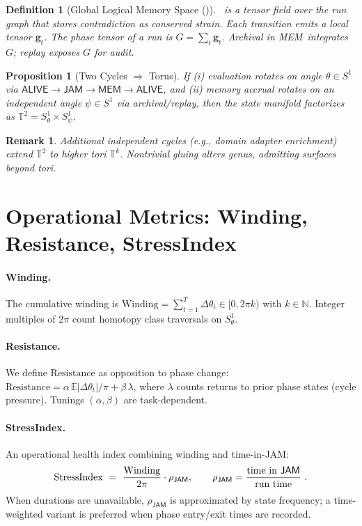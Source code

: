 \documentclass[11pt]{article}
\newtheorem{definition}{Definition}
\newtheorem{proposition}{Proposition}
\newtheorem{remark}{Remark}
\newcommand{\Alive}{\textsf{ALIVE}}
\newcommand{\Jam}{\textsf{JAM}}
\newcommand{\Mem}{\textsf{MEM}}
\newcommand{\T}{\mathbb{T}}
\newcommand{\Stress}{\mathrm{StressIndex}}
\newcommand{\Resist}{\mathrm{Resistance}}
\newcommand{\Wind}{\mathrm{Winding}}
\newcommand{\GLMS}{\mathrm{GLMS}}
\begin{document}
\begin{definition}[Global Logical Memory Space (\GLMS)]
\GLMS\ is a tensor field over the run graph that stores contradiction as conserved strain. Each transition emits a local tensor $\bm{g}_t$.
The \emph{phase tensor} of a run is $G=\sum_t \bm{g}_t$. Archival in \Mem\ integrates $G$; replay exposes $G$ for audit.
\end{definition}

\begin{proposition}[Two Cycles $\Rightarrow$ Torus]
If (i) evaluation rotates on angle $\theta\in S^1$ via $\Alive\!\to\!\Jam\!\to\!\Mem\!\to\!\Alive$, and 
(ii) memory accrual rotates on an independent angle $\psi\in S^1$ via archival/replay, then the state manifold factorizes as $\T^2=S^1_\theta\times S^1_\psi$.
\end{proposition}

\begin{remark}
Additional independent cycles (e.g., domain adapter enrichment) extend $\T^2$ to higher tori $\T^k$. Nontrivial gluing alters genus, admitting surfaces beyond tori.
\end{remark}

\section{Operational Metrics: Winding, Resistance, StressIndex}
\paragraph{Winding.}
The cumulative winding is $\Wind=\sum_{t=1}^{T}\Delta\theta_t \in [0,2\pi k)$ with $k\in\mathbb{N}$. 
Integer multiples of $2\pi$ count homotopy class traversals on $S^1_\theta$.

\paragraph{Resistance.}
We define $\Resist$ as opposition to phase change: $\Resist=\alpha\,\mathbb{E}|\Delta\theta_t|/\pi + \beta\,\lambda$, 
where $\lambda$ counts returns to prior phase states (cycle pressure). Tunings $(\alpha,\beta)$ are task-dependent.

\paragraph{StressIndex.}
An operational health index combining winding and time-in-\Jam: 
\begin{equation}
\Stress \ =\ \frac{\Wind}{2\pi}\cdot \rho_{\Jam},\qquad \rho_{\Jam}=\frac{\text{time in \Jam}}{\text{run time}}\ .
\end{equation}
When durations are unavailable, $\rho_{\Jam}$ is approximated by state frequency; a time-weighted variant is preferred when phase entry/exit times are recorded.
\end{document}
